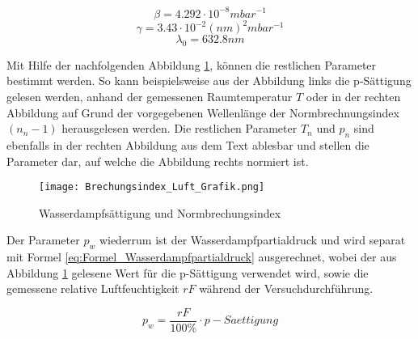 \begin{equation*}
\beta = 4.292 \cdot 10^{-8} mbar^{-1}
\label{eq:Faktor_Beta}
\end{equation*}
\begin{equation*}
\gamma = 3.43 \cdot 10^{-2} (nm)^{2}mbar^{-1}
\label{eq:Faktor_Gamma}
\end{equation*}
\begin{equation*}
\lambda_{0} = 632.8 nm
\label{eq:Faktor_Lambda}
\end{equation*}

Mit Hilfe der nachfolgenden Abbildung \ref{fig:Wasserdampfsättigung und Normbrechungsindex}, können die restlichen Parameter bestimmt werden. So kann beispielsweise aus der Abbildung links die p-Sättigung gelesen werden, anhand der gemessenen Raumtemperatur $T$ oder in der rechten Abbildung auf Grund der vorgegebenen Wellenlänge der Normbrechnungsindex $(n_{n} - 1)$ herausgelesen werden. Die restlichen Parameter $T_{n}$ und $p_{n}$ sind ebenfalls in der rechten Abbildung aus dem Text ablesbar und stellen die Parameter dar, auf welche die Abbildung rechts normiert ist.

\begin{figure}[b]
\texttt{[image: Brechungsindex\_Luft\_Grafik.png]}
\caption{Wasserdampfsättigung und Normbrechungsindex}
\label{fig:Wasserdampfsättigung und Normbrechungsindex}
\end{figure}

Der Parameter $p_{w}$ wiederrum ist der Wasserdampfpartialdruck und wird separat mit Formel \ref{eq:Formel_Wasserdampfpartialdruck} ausgerechnet, wobei der aus Abbildung \ref{fig:Wasserdampfsättigung und Normbrechungsindex} gelesene Wert für die p-Sättigung verwendet wird, sowie die gemessene relative Luftfeuchtigkeit $rF$ während der Versuchdurchführung.


\begin{equation}
p_{w} = \dfrac{rF}{100\%}\cdot p-Saettigung
\label{eq:Formel_Wasserdampfpartialdruck}
\end{equation}

